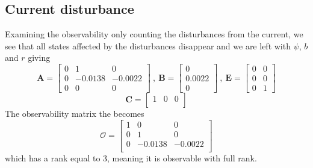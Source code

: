 \subsection{Current disturbance}
Examining the observability only counting the disturbances from the current, we see that all states affected by the disturbances disappear and we are left with $\psi$, $b$ and $r$ giving 
\begin{equation}
    \boldsymbol{A} = \begin{bmatrix}
        0 & 1 & 0 \\
        0 & -0.0138 & -0.0022 \\
        0 & 0 & 0 
    \end{bmatrix} \ , \ \boldsymbol{B} = \begin{bmatrix}
        0 \\ 0.0022 \\ 0
    \end{bmatrix}\ , \ \boldsymbol{E} = \begin{bmatrix}
        0 & 0 \\
        0 & 0 \\
        0 & 1 
    \end{bmatrix}
\end{equation}
\begin{equation}
    \boldsymbol{C} = \begin{bmatrix} 
        1 & 0 & 0 \\
    \end{bmatrix}
\end{equation}
The observability matrix the becomes 
\begin{equation}
  \boldsymbol{\mathcal{O}} =
  \begin{bmatrix}
    1 & 0 & 0 \\
    0 & 1 & 0 \\
    0 & -0.0138 & -0.0022 \\
  \end{bmatrix}
\end{equation}
which has a rank equal to 3, meaning it is observable with full rank.

